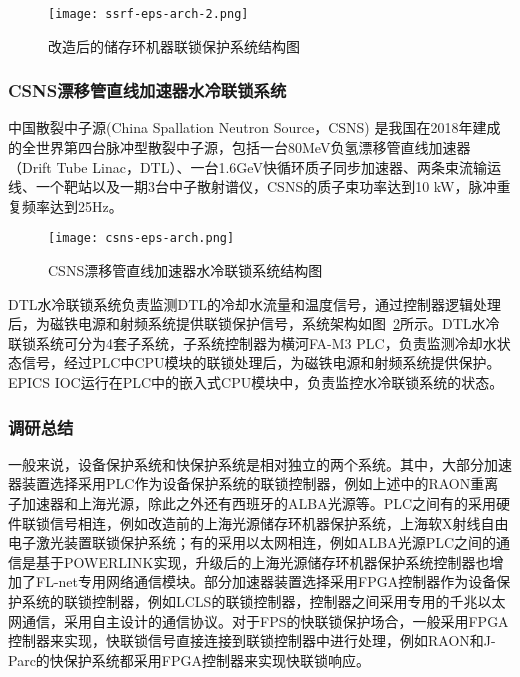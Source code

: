   \begin{figure}[!htb]
	\centering
	\texttt{[image: ssrf-eps-arch-2.png]}
	\caption{改造后的储存环机器联锁保护系统结构图}
	\label{fig:ssrf-eps-arch-2}
\end{figure}

\subsubsection{CSNS漂移管直线加速器水冷联锁系统}

中国散裂中子源(China Spallation Neutron Source，CSNS) 是我国在2018年建成的全世界第四台脉冲型散裂中子源，包括一台80MeV负氢漂移管直线加速器（Drift Tube Linac，DTL）、一台1.6GeV快循环质子同步加速器、两条束流输运线、一个靶站以及一期3台中子散射谱仪，CSNS的质子束功率达到10 kW，脉冲重复频率达到25Hz。

  \begin{figure}[!htb]
	\centering
	\texttt{[image: csns-eps-arch.png]}
	\caption{CSNS漂移管直线加速器水冷联锁系统结构图}
	\label{fig:csns-eps-arch}
\end{figure}


DTL水冷联锁系统负责监测DTL的冷却水流量和温度信号，通过控制器逻辑处理后，为磁铁电源和射频系统提供联锁保护信号，系统架构如图~\ref{fig:csns-eps-arch}所示。DTL水冷联锁系统可分为4套子系统，子系统控制器为横河FA-M3 PLC，负责监测冷却水状态信号，经过PLC中CPU模块的联锁处理后，为磁铁电源和射频系统提供保护。EPICS IOC运行在PLC中的嵌入式CPU模块中，负责监控水冷联锁系统的状态\cite{he2017}。



\subsubsection{调研总结}

一般来说，设备保护系统和快保护系统是相对独立的两个系统。其中，大部分加速器装置选择采用PLC作为设备保护系统的联锁控制器，例如上述中的RAON重离子加速器和上海光源，除此之外还有西班牙的ALBA光源等。PLC之间有的采用硬件联锁信号相连，例如改造前的上海光源储存环机器保护系统，上海软X射线自由电子激光装置联锁保护系统\cite{yu2018}；有的采用以太网相连，例如ALBA光源PLC之间的通信是基于POWERLINK实现\cite{Alba-eps}，升级后的上海光源储存环机器保护系统控制器也增加了FL-net专用网络通信模块\cite{yu2020}。部分加速器装置选择采用FPGA控制器作为设备保护系统的联锁控制器，例如LCLS的联锁控制器，控制器之间采用专用的千兆以太网通信，采用自主设计的通信协议\cite{Norum-2009}。对于FPS的快联锁保护场合，一般采用FPGA控制器来实现，快联锁信号直接连接到联锁控制器中进行处理，例如RAON和J-Parc的快保护系统都采用FPGA控制器来实现快联锁响应\cite{jparc}。

